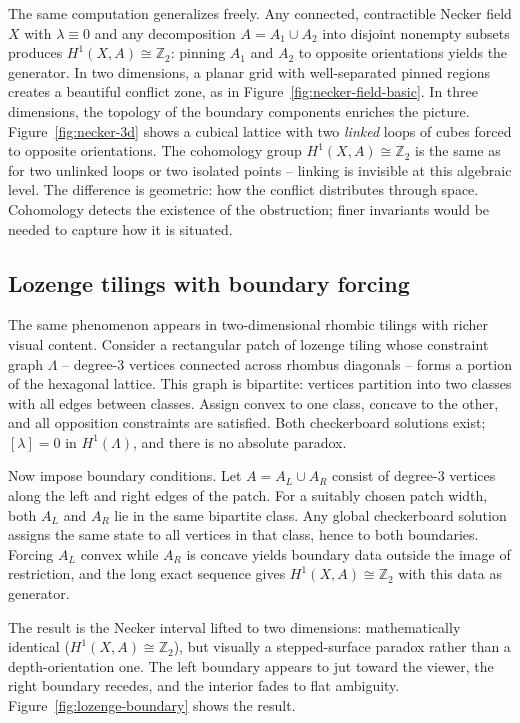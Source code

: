 \documentclass[11pt]{amsart}  %
\theoremstyle{plain}
\theoremstyle{definition}
\theoremstyle{remark}
\newcommand{\Z}{\mathbb{Z}} %
\newcommand{\cgraph}{\Lambda} %
\newcommand{\coupling}{\lambda} %
\begin{document}
The same computation generalizes freely. Any connected, contractible Necker field $X$ with $\coupling \equiv 0$ and any decomposition $A = A_1 \cup A_2$ into disjoint nonempty subsets produces $H^1(X, A) \cong \Z_2$: pinning $A_1$ and $A_2$ to opposite orientations yields the generator. In two dimensions, a planar grid with well-separated pinned regions creates a beautiful conflict zone, as in Figure~\ref{fig:necker-field-basic}. In three dimensions, the topology of the boundary components enriches the picture. Figure~\ref{fig:necker-3d} shows a cubical lattice with two \emph{linked} loops of cubes forced to opposite orientations. The cohomology group $H^1(X, A) \cong \Z_2$ is the same as for two unlinked loops or two isolated points -- linking is invisible at this algebraic level. The difference is geometric: how the conflict distributes through space. Cohomology detects the existence of the obstruction; finer invariants would be needed to capture how it is situated.

\subsection{Lozenge tilings with boundary forcing}
\label{sec:lozenge-boundary}

The same phenomenon appears in two-dimensional rhombic tilings with richer visual content. Consider a rectangular patch of lozenge tiling whose constraint graph $\cgraph$ -- degree-3 vertices connected across rhombus diagonals -- forms a portion of the hexagonal lattice. This graph is bipartite: vertices partition into two classes with all edges between classes. Assign convex to one class, concave to the other, and all opposition constraints are satisfied. Both checkerboard solutions exist; $[\coupling] = 0$ in $H^1(\cgraph)$, and there is no absolute paradox.

Now impose boundary conditions. Let $A = A_L \cup A_R$ consist of degree-3 vertices along the left and right edges of the patch. For a suitably chosen patch width, both $A_L$ and $A_R$ lie in the same bipartite class. Any global checkerboard solution assigns the same state to all vertices in that class, hence to both boundaries. Forcing $A_L$ convex while $A_R$ is concave yields boundary data outside the image of restriction, and the long exact sequence gives $H^1(X, A) \cong \Z_2$ with this data as generator.

The result is the Necker interval lifted to two dimensions: mathematically identical ($H^1(X,A) \cong \Z_2$), but visually a stepped-surface paradox rather than a depth-orientation one. The left boundary appears to jut toward the viewer, the right boundary recedes, and the interior fades to flat ambiguity. Figure~\ref{fig:lozenge-boundary} shows the result. 
\end{document}
